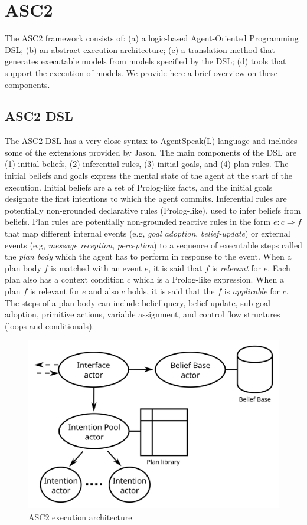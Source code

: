 \section{ASC2}
The ASC2 framework consists of: (a) a logic-based Agent-Oriented Programming DSL; (b) an abstract execution architecture; (c) a translation method that generates executable models from models specified by the DSL; (d) tools that support the execution of models. We provide here a brief overview on these components.

\subsection{ASC2 DSL}
\label{section_dsl}
The ASC2 DSL has a very close syntax to AgentSpeak(L) language and includes some of the extensions provided by Jason. The main components of the DSL are (1) initial beliefs, (2) inferential rules, (3) initial goals, and (4) plan rules. The initial beliefs and goals express the mental state of the agent at the start of the execution. Initial beliefs are a set of Prolog-like facts, 
and the initial goals designate the first intentions to which the agent commits. Inferential rules are potentially non-grounded declarative rules (Prolog-like), used to infer beliefs from beliefs. Plan rules are potentially non-grounded reactive rules in the form $e : c \Rightarrow f$ that map different internal events (e.g, \textit{goal adoption}, \textit{belief-update}) or external events (e.g, \textit{message reception}, \textit{perception}) to a sequence of executable steps called the \textit{plan body} which the agent has to perform in response to the event. When a plan body $f$ is matched with an event $e$, it is said that $f$ is \textit{relevant} for $e$. Each plan also has a context condition $c$ which is a Prolog-like expression. When a plan $f$ is relevant for $e$ and also $c$ holds, it is said that the $f$ is \textit{applicable} for $c$. The steps of a plan body can include belief query, belief update, sub-goal adoption, primitive actions, variable assignment,  and control flow structures %
(loops and conditionals). %

\begin{figure}[t!]
  \centering
  \hspace{-5pt}
  \includegraphics[width=0.75\linewidth]{ch2/arch3.png}
  \caption{ASC2 execution architecture}
\end{figure}


